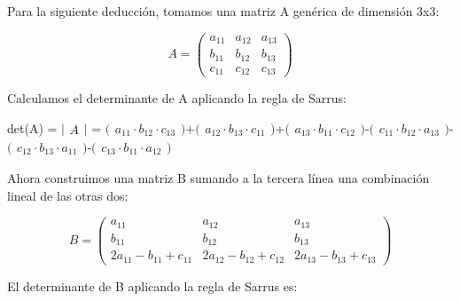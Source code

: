 \documentclass[11pt]{article}
\begin{document}
    Para la siguiente deducción, tomamos una matriz A genérica de dimensión
3x3:

    \begin{equation}
A =
    \begin{pmatrix}
        a_{11} & a_{12} & a_{13}\\
        b_{11} & b_{12} & b_{13}\\
        c_{11} & c_{12} & c_{13}
    \end{pmatrix}
\end{equation}

    Calculamos el determinante de A aplicando la regla de Sarrus:

    det(A) = \(\bigl|\begin{matrix}A\end{matrix}\bigr|\) =
\(\bigl(\begin{matrix}a_{11} \cdot b_{12} \cdot c_{13}\end{matrix}\bigr)\)+\(\bigl(\begin{matrix}a_{12} \cdot b_{13} \cdot c_{11}\end{matrix}\bigr)\)+\(\bigl(\begin{matrix}a_{13} \cdot b_{11} \cdot c_{12}\end{matrix}\bigr)\)-\(\bigl(\begin{matrix}c_{11} \cdot b_{12} \cdot a_{13}\end{matrix}\bigr)\)-\(\bigl(\begin{matrix}c_{12} \cdot b_{13} \cdot a_{11}\end{matrix}\bigr)\)-\(\bigl(\begin{matrix}c_{13} \cdot b_{11} \cdot a_{12}\end{matrix}\bigr)\)

    Ahora construimos una matriz B sumando a la tercera línea una
combinación lineal de las otras dos:

    \begin{equation}
B =
    \begin{pmatrix}
        a_{11} & a_{12} & a_{13}\\
        b_{11} & b_{12} & b_{13}\\
        2a_{11}-b_{11}+c_{11} & 2a_{12}-b_{12}+c_{12} & 2a_{13}-b_{13}+c_{13}
    \end{pmatrix}
\end{equation}

    El determinante de B aplicando la regla de Sarrus es:
\end{document}
